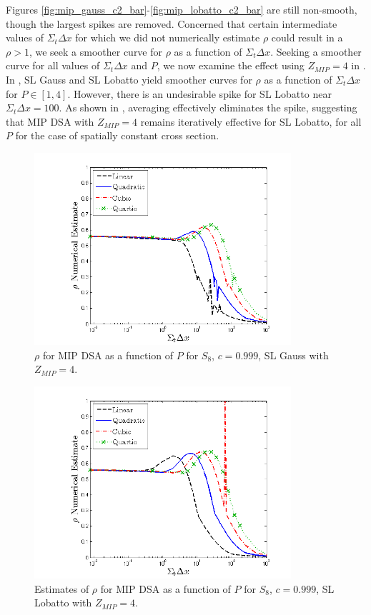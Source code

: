 Figures \ref{fig:mip_gauss_c2_bar}-\ref{fig:mip_lobatto_c2_bar} are still non-smooth, though the largest spikes are removed.
Concerned that certain intermediate values of $\Sigma_t \Delta x$ for which we did not numerically estimate $\rho$ could result in a $\rho>1$, we seek a smoother curve for $\rho$ as a function of $\Sigma_t \Delta x$.
Seeking a smoother curve for all values of $\Sigma_t \Delta x$ and $P$, we now examine the effect  using $Z_{MIP}=4$ in .
In , SL Gauss and SL Lobatto yield smoother curves for $\rho$ as a function of $\Sigma_t \Delta x$ for $P\in[1,4]$.  
However, there is an undesirable spike for SL Lobatto near $\Sigma_t \Delta x =100$.
As shown in , averaging effectively eliminates the spike, suggesting that MIP DSA with $Z_{MIP}=4$ remains iteratively effective for SL Lobatto, for all $P$ for the case of spatially constant cross section.
%
%
%
%
\begin{figure}[!htp]
\centering
\includegraphics[width=9.5cm]{chapter4_acceleration/Const_4_Constant_XS_SN8_MIP_Gauss.png}
\caption{$\rho$ for MIP DSA as a function of $P$ for  $S_8$, $c=0.999$, SL Gauss with $Z_{MIP}=4$.}
\label{fig:mip_gauss_z4}
\end{figure}
%
\vfill{}
%
\begin{figure}[!htp]
\centering
\includegraphics[width=9.5cm]{chapter4_acceleration/Const_4_Constant_XS_SN8_MIP_Lobatto.png}
\caption{Estimates of $\rho$ for MIP DSA as a function of $P$ for $S_8$, $c=0.999$,  SL Lobatto with $Z_{MIP}=4$.}
\label{fig:mip_lobatto_z4}
\end{figure}
